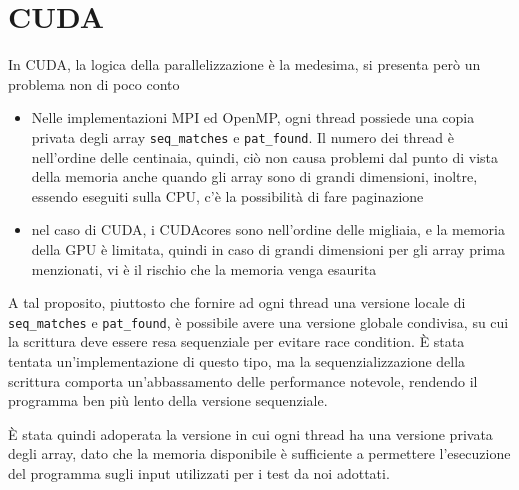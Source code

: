 \documentclass[12pt,openany]{report}
\begin{document}
\newpage 
\section{CUDA}
In CUDA, la logica della parallelizzazione è la medesima, si presenta però un problema non di poco conto\begin{itemize}
    \item Nelle implementazioni MPI ed OpenMP, ogni thread possiede una copia privata degli array \texttt{seq\_matches} e \texttt{pat\_found}. Il numero dei thread è nell'ordine delle centinaia, quindi, ciò non causa problemi dal punto di vista della memoria anche quando gli array sono di grandi dimensioni, inoltre, essendo eseguiti sulla CPU, c'è la possibilità di fare paginazione
    \item nel caso di CUDA, i CUDAcores sono nell'ordine delle migliaia, e la memoria della GPU è limitata, quindi in caso di grandi dimensioni per gli array prima menzionati, vi è il rischio che la memoria venga esaurita
\end{itemize} 
A tal proposito, piuttosto che fornire ad ogni thread una versione locale di  \texttt{seq\_matches} e \texttt{pat\_found}, è possibile avere una versione globale condivisa, su cui la scrittura deve essere resa sequenziale per evitare race condition. È stata tentata un'implementazione di questo tipo, ma la sequenzializzazione della scrittura comporta un'abbassamento delle performance notevole, rendendo il programma ben più lento della versione sequenziale.\bigskip 

È stata quindi adoperata la versione in cui ogni thread ha una versione privata degli array, dato che la memoria disponibile è sufficiente a permettere l'esecuzione del programma sugli input utilizzati per i test da noi adottati.\bigskip 
\end{document}
